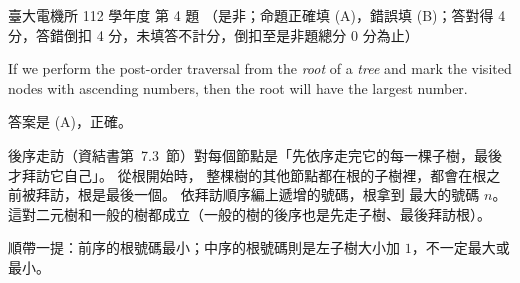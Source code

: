 \begin{pastexam}[label={px:ntu-112-ee-ds-04}]{臺大電機所 112 學年度 第 4 題}
（是非；命題正確填 (A)，錯誤填 (B)；答對得 4 分，答錯倒扣 4 分，未填答不計分，倒扣至是非題總分 0 分為止）

If we perform the post-order traversal from the \textit{root} of a \textit{tree} and mark the visited nodes with ascending numbers, then the root will have the largest number.
\end{pastexam}

\begin{pastsoln}
答案是 (A)，正確。

後序走訪（資結書第~7.3~節）對每個節點是「先依序走完它的每一棵子樹，最後才拜訪它自己」。 從根開始時，
整棵樹的其他節點都在根的子樹裡，都會在根之前被拜訪，根是最後一個。 依拜訪順序編上遞增的號碼，根拿到
最大的號碼 $n$。 這對二元樹和一般的樹都成立（一般的樹的後序也是先走子樹、最後拜訪根）。

順帶一提：前序的根號碼最小；中序的根號碼則是左子樹大小加 $1$，不一定最大或最小。
\end{pastsoln}
